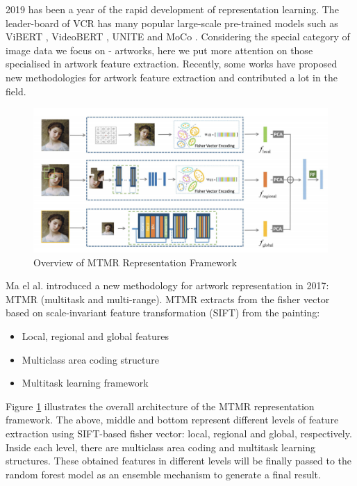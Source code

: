 2019 has been a year of the rapid development of representation learning. The leader-board of VCR \cite{zellers2019vcr} has many popular large-scale pre-trained models such as ViBERT \cite{lu2019vilbert}, VideoBERT \cite{sun2019videobert}, UNITE \cite{chen2019uniter} and MoCo \cite{he2019momentum}. Considering the special category of image data we focus on - artworks, here we put more attention on those specialised in artwork feature extraction. Recently, some works \cite{TranslatingArtworks,parttowhole,Art2Real,tan2017artgan,shen2019discovering} have proposed new methodologies for artwork feature extraction and contributed a lot in the field. 


\begin{figure}[h!]
\centering
\includegraphics[width=\textwidth]{MTMRoverview.pdf}
\caption{Overview of MTMR Representation Framework \cite{parttowhole}}
\label{fig:mtmroverview}
\end{figure}


Ma el al. \cite{parttowhole} introduced a new methodology for artwork representation in 2017: MTMR (multitask and multi-range). MTMR extracts from the fisher vector based on scale-invariant feature transformation (SIFT) from the painting:

\begin{itemize}
    \item Local, regional and global features
    \item Multiclass area coding structure
    \item Multitask learning framework
\end{itemize}

Figure \ref{fig:mtmroverview} illustrates the overall architecture of the MTMR representation framework. The above, middle and bottom represent different levels of feature extraction using SIFT-based fisher vector: local, regional and global, respectively. Inside each level, there are multiclass area coding and multitask learning structures. These obtained features in different levels will be finally passed to the random forest model as an ensemble mechanism to generate a final result.

